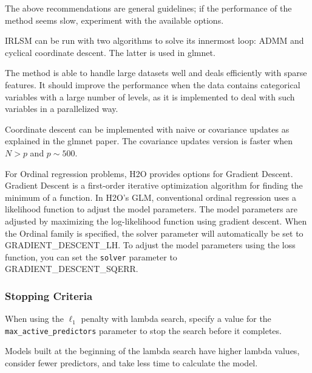  The above recommendations are general guidelines; if the performance of the method seems slow, experiment with the available options. 

IRLSM can be run with two algorithms to solve its innermost loop: ADMM and cyclical coordinate descent. The latter is used in glmnet. 

The method is able to handle large datasets well and deals efficiently with sparse features. It should improve the performance when the data contains categorical variables with a large number of levels, as it is implemented to deal with such variables in a parallelized way. 

Coordinate descent can be implemented with naive or covariance updates as explained in the glmnet paper. The covariance updates version is faster when $N>p$ and $p \sim 500$. 

For Ordinal regression problems, H2O provides options for Gradient Descent. Gradient Descent is a first-order iterative optimization algorithm for finding the minimum of a function. In H2O's GLM, conventional ordinal regression uses a likelihood function to adjust the model parameters. The model parameters are adjusted by maximizing the log-likelihood function using gradient descent. When the Ordinal family is specified, the solver parameter will automatically be set to GRADIENT\_DESCENT\_LH. To adjust the model parameters using the loss function, you can set the \texttt{solver} parameter to GRADIENT\_DESCENT\_SQERR.

\subsubsection{Stopping Criteria}

When using the $\ell_1$ penalty with lambda search, specify a value for the \\ \texttt{max\_active\_predictors} parameter to stop the search before it completes.  

Models built at the beginning of the lambda search have higher lambda values, consider fewer predictors, and take less time to calculate the model. 

